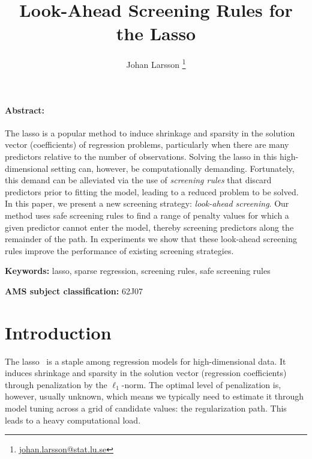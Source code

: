 \documentclass[b5paper,10pt,abstractoff,DIV=calc,headings=normal,twoside]{scrartcl}
\makeatletter
\newcommand{\shortauthor}{}
\newcommand{\shorttitle}{\@title}
\def\AMS#1{\par\noindent \textbf{AMS subject classification: }#1\par}
\newcommand{\keywords}[1]{\par\noindent\textbf{Keywords: }#1}
\theoremstyle{plain}
\theoremstyle{definition}
\theoremstyle{remark}
\renewenvironment{abstract}{\bigskip\noindent\begin{minipage}{\textwidth}\setlength{\parindent}{15pt}\paragraph{Abstract:}}{\end{minipage}}
\makeatother
\begin{document}

\renewcommand{\shortauthor}{J. Larsson}

\title{Look-Ahead Screening Rules for the Lasso}

\author[1]{Johan Larsson%
  \thanks{%
    \href{mailto:johan.larsson@stat.lu.se}{\url{johan.larsson@stat.lu.se}}
  }%
}

\maketitle

\begin{abstract}
  The lasso is a popular method to induce shrinkage and sparsity in the
  solution vector (coefficients) of regression problems, particularly
  when there are many predictors relative to the number of observations. Solving
  the lasso in this high-dimensional setting can, however, be computationally
  demanding. Fortunately, this demand can be alleviated via the
  use of \emph{screening rules} that discard predictors prior to
  fitting the model, leading to a reduced problem to be solved.
  In this paper, we present a new screening strategy: \emph{look-ahead
    screening}. Our method uses safe screening rules to find a range of
  penalty values for which a given predictor cannot enter the model,
  thereby screening predictors along the remainder of the path.
  In experiments we show that these look-ahead screening rules improve the
  performance of existing screening strategies.
\end{abstract}

\keywords{lasso, sparse regression, screening rules, safe screening rules}

\smallskip

\AMS{62J07}

\section{Introduction}

The lasso~\cite{tibshirani1996} is a staple among regression models for
high-dimensional data. It induces shrinkage and sparsity in the solution
vector (regression coefficients) through penalization by the
\(\ell_1\)-norm. The optimal level of penalization is, however, usually
unknown, which means we typically need to estimate it through model tuning
across a grid of candidate values: the regularization path. This leads to a
heavy computational load.
\end{document}
